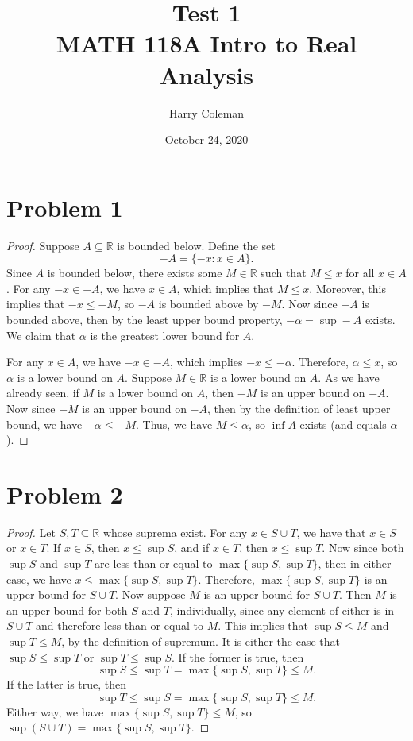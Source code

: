 \documentclass[12pt]{article}
\newcommand{\R}{\mathbb{R}}
\begin{document}
 
\title{Test 1\\
    \large MATH 118A Intro to Real Analysis
}
\author{Harry Coleman}
\date{October 24, 2020}
\maketitle

\section*{Problem 1}
\begin{proof}
    Suppose $A\subseteq\R$ is bounded below. Define the set
    \[-A = \{-x : x\in A\}.\]
    Since $A$ is bounded below, there exists some $M\in\R$ such that $M\leq x$ for all $x\in A$. For any $-x\in - A$, we have $x\in A$, which implies that $M\leq x$. Moreover, this implies that $-x\leq - M$, so $-A$ is bounded above by $-M$. Now since $-A$ is bounded above, then by the least upper bound property, $-\alpha = \sup-A$ exists. We claim that $\alpha$ is the greatest lower bound for $A$.
    
    For any $x\in A$, we have $-x\in-A$, which implies $-x\leq - \alpha$. Therefore, $\alpha \leq x$, so $\alpha$ is a lower bound on $A$. Suppose $M\in\R$ is a lower bound on $A$. As we have already seen, if $M$ is a lower bound on $A$, then $-M$ is an upper bound on $-A$. Now since $-M$ is an upper bound on $-A$, then by the definition of least upper bound, we have $-\alpha\leq-M$. Thus, we have $M\leq \alpha$, so $\inf A$ exists (and equals $\alpha$).
    
\end{proof}

\section*{Problem 2}
\begin{proof}
    Let $S,T\subseteq\R$ whose suprema exist. For any $x\in S\cup T$, we have that $x\in S$ or $x\in T$. If $x\in S$, then $x\leq \sup S$, and if $x\in T$, then $x\leq\sup T$. Now since both $\sup S$ and $\sup T$ are less than or equal to $\max\{\sup S, \sup T\}$, then in either case, we have $x\leq\max\{\sup S, \sup T\}$. Therefore, $\max\{\sup S, \sup T\}$ is an upper bound for $S\cup T$. Now suppose $M$ is an upper bound for $S\cup T$. Then $M$ is an upper bound for both $S$ and $T$, individually, since any element of either is in $S\cup T$ and therefore less than or equal to $M$. This implies that $\sup S \leq M$ and $\sup T \leq M$, by the definition of supremum. It is either the case that $\sup S\leq \sup T$ or $\sup T\leq \sup S$. If the former is true, then
    \[\sup S\leq \sup T = \max\{\sup S, \sup T\} \leq M.\]
    If the latter is true, then
    \[\sup T\leq \sup S = \max\{\sup S, \sup T\} \leq M.\]
    Either way, we have $\max\{\sup S, \sup T\} \leq M$, so $\sup(S\cup T) = \max\{\sup S, \sup T\}$.
    
\end{proof}
\end{document}
